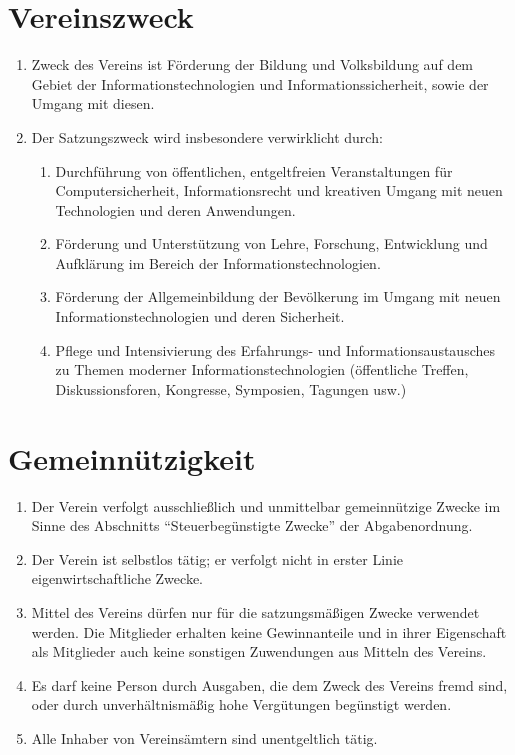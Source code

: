 \documentclass[a4paper,ngerman]{scrartcl}
\begin{document}
\section{Vereinszweck}
\begin{enumerate}
\item Zweck des Vereins ist Förderung der Bildung und Volksbildung auf dem Gebiet der Informationstechnologien und Informationssicherheit, sowie der Umgang mit diesen.
\item Der Satzungszweck wird insbesondere verwirklicht durch:
\begin{enumerate}
\item Durchführung von öffentlichen, entgeltfreien Veranstaltungen für Computersicherheit, Informationsrecht und kreativen Umgang mit neuen Technologien und deren Anwendungen.
\item Förderung und Unterstützung von Lehre, Forschung, Entwicklung und Aufklärung im Bereich der Informationstechnologien.
\item Förderung der Allgemeinbildung der Bevölkerung im Umgang mit neuen Informationstechnologien und deren Sicherheit.
\item Pflege und Intensivierung des Erfahrungs- und Informationsaustausches zu Themen moderner Informationstechnologien (öffentliche Treffen, Diskussionsforen, Kongresse, Symposien, Tagungen usw.)
\end{enumerate}
\end{enumerate}

\section{Gemeinnützigkeit}
\begin{enumerate}
\item Der Verein verfolgt ausschließlich und unmittelbar gemeinnützige Zwecke im Sinne des Abschnitts "`Steuerbegünstigte Zwecke"' der Abgabenordnung.
\item Der Verein ist selbstlos tätig; er verfolgt nicht in erster Linie eigenwirtschaftliche Zwecke.
\item Mittel des Vereins dürfen nur für die satzungsmäßigen Zwecke verwendet werden. Die Mitglieder erhalten keine Gewinnanteile und in ihrer Eigenschaft als Mitglieder auch keine sonstigen Zuwendungen aus Mitteln des Vereins.
\item Es darf keine Person durch Ausgaben, die dem Zweck des Vereins fremd sind, oder durch unverhältnismäßig hohe Vergütungen begünstigt werden.
\item Alle Inhaber von Vereinsämtern sind unentgeltlich tätig.
\end{enumerate}
\end{document}
